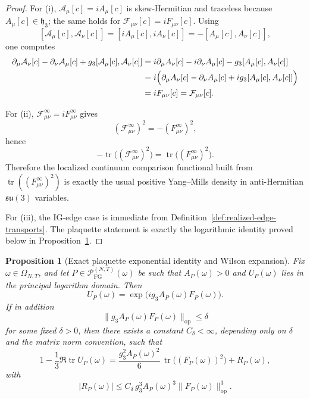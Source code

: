 \documentclass[11pt]{article}
\newtheorem{proposition}[theorem]{Proposition}
\theoremstyle{definition}
\theoremstyle{remark}
\newcommand{\mcP}{\mathcal P}
\newcommand{\tr}{\operatorname{tr}}
\newcommand{\fraksu}{\mathfrak{su}(3)}
\newcommand{\mathfrakh}{\mathfrak h_3}
\begin{document}
\begin{proof}
For \textnormal{(i)}, \(\mathcal A_\mu[c]=iA_\mu[c]\) is skew-Hermitian and
traceless because \(A_\mu[c]\in\mathfrakh\); the same holds for
\(\mathcal F_{\mu\nu}[c]=iF_{\mu\nu}[c]\). Using
\[
[\mathcal A_\mu[c],\mathcal A_\nu[c]]
=[iA_\mu[c],iA_\nu[c]]
=-[A_\mu[c],A_\nu[c]],
\]
one computes
\begin{align*}
\partial_\mu\mathcal A_\nu[c]-\partial_\nu\mathcal A_\mu[c]
+g_3[\mathcal A_\mu[c],\mathcal A_\nu[c]]
&=
i\partial_\mu A_\nu[c]-i\partial_\nu A_\mu[c]-g_3[A_\mu[c],A_\nu[c]]\\
&=
i\Bigl(\partial_\mu A_\nu[c]-\partial_\nu A_\mu[c]
+ig_3[A_\mu[c],A_\nu[c]]\Bigr)\\
&=
iF_{\mu\nu}[c]
=
\mathcal F_{\mu\nu}[c].
\end{align*}

For \textnormal{(ii)}, \(\mathcal F_{\mu\nu}^\infty=iF_{\mu\nu}^\infty\) gives
\[
(\mathcal F_{\mu\nu}^\infty)^2
=
- (F_{\mu\nu}^\infty)^2,
\]
hence
\[
-\tr\!\bigl((\mathcal F_{\mu\nu}^\infty)^2\bigr)
=
\tr\!\bigl((F_{\mu\nu}^\infty)^2\bigr).
\]
Therefore the localized continuum comparison functional built from
\(\tr((F_{\mu\nu}^\infty)^2)\) is exactly the usual positive Yang--Mills
density in anti-Hermitian \(\fraksu\) variables.

For \textnormal{(iii)}, the IG-edge case is immediate from
Definition~\ref{def:realized-edge-transports}. The plaquette statement is
exactly the logarithmic identity proved below in
Proposition~\ref{prop:random-plaquette-wilson-expansion}.
\end{proof}

\begin{proposition}[Exact plaquette exponential identity and Wilson expansion]
\label{prop:random-plaquette-wilson-expansion}
Fix \(\omega\in\Omega_{N,T}\), and let
\(P\in\mcP_{\mathrm{FG}}^{(N,T)}(\omega)\) be such that \(A_P(\omega)>0\) and
\(U_P(\omega)\) lies in the principal logarithm domain.
Then
\[
U_P(\omega)=\exp\!\bigl(i g_3 A_P(\omega)F_P(\omega)\bigr).
\]
If in addition
\[
\|g_3A_P(\omega)F_P(\omega)\|_{\mathrm{op}}\le \delta
\]
for some fixed $\delta>0$, then there exists a constant $C_\delta<\infty$,
depending only on $\delta$ and the matrix norm convention, such that
\[
1-\frac13\Re\tr U_P(\omega)
=
\frac{g_3^2A_P(\omega)^2}{6}\,
\tr\!\bigl((F_P(\omega))^2\bigr)
+R_P(\omega),
\]
with
\[
|R_P(\omega)|
\le
C_\delta\,g_3^3A_P(\omega)^3\|F_P(\omega)\|_{\mathrm{op}}^3.
\]
\end{proposition}
\end{document}
